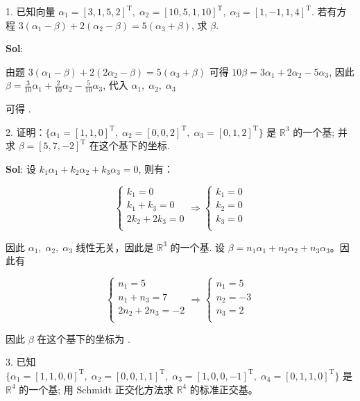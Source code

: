 
1. 已知向量 $\alpha_1=[3,1,5,2]^\text{T},\;\alpha_2=[10,5,1,10]^\text{T},\;\alpha_3=[1,-1,1,4]^\text{T}$. 若有方程 $3(\alpha_1-\beta)+2(\alpha_2-\beta)=5(\alpha_3+\beta)$, 求 $\beta$.

\textbf{Sol}: 

由题 $3(\alpha_1-\beta)+2(2\alpha_2-\beta)=5(\alpha_3+\beta)$ 
可得 $10\beta=3\alpha_1+2\alpha_2-5\alpha_3$, 
因此 $\beta=\frac{3}{10}\alpha_1+\frac{2}{10}\alpha_2-\frac{5}{10}\alpha_3$, 
代入 $\alpha_1,\;\alpha_2,\;\alpha_3$ 

可得 .


2. 证明：$\Big\{\alpha_1=[1,1,0]^\text{T},\;\alpha_2=[0,0,2]^\text{T},\;\alpha_3=[0,1,2]^\text{T}\Big\}$ 是 $\mathbb{R}^3$ 的一个基; 并求 $\beta=[5,7,-2]^\text{T}$ 在这个基下的坐标.

\textbf{Sol}: 设 $k_1\alpha_1+k_2\alpha_2+k_3\alpha_3=0$, 则有：

$$
\begin{cases}
k_1=0\\
k_1+k_3=0\\
2k_2+2k_3=0\\
\end{cases}
\Rightarrow 
\begin{cases}
    k_1=0\\
    k_2=0\\
    k_3=0\\
\end{cases}
$$

因此 $\alpha_1,\;\alpha_2,\;\alpha_3$ 线性无关，因此是 $\mathbb{R}^3$ 的一个基. 设 $\beta=n_1\alpha_1+n_2\alpha_2+n_3\alpha_3$。因此有

$$
\begin{cases}
    n_1=5\\
    n_1+n_3=7\\
    2n_2+2n_3=-2\\
\end{cases}
\Rightarrow
\begin{cases}
    n_1=5\\
    n_2=-3\\
    n_3=2\\
\end{cases}
$$


因此 $\beta$ 在这个基下的坐标为 .

3. 已知 $\Big\{\alpha_1=[1,1,0,0]^\text{T},\;\alpha_2=[0,0,1,1]^\text{T},\;\alpha_3=[1,0,0,-1]^\text{T},\;\alpha_4=[0,1,1,0]^\text{T}\Big\}$ 是 $\mathbb{R}^4$ 的一个基; 用 $\text{Schmidt}$ 正交化方法求 $\mathbb{R}^4$ 的标准正交基。

